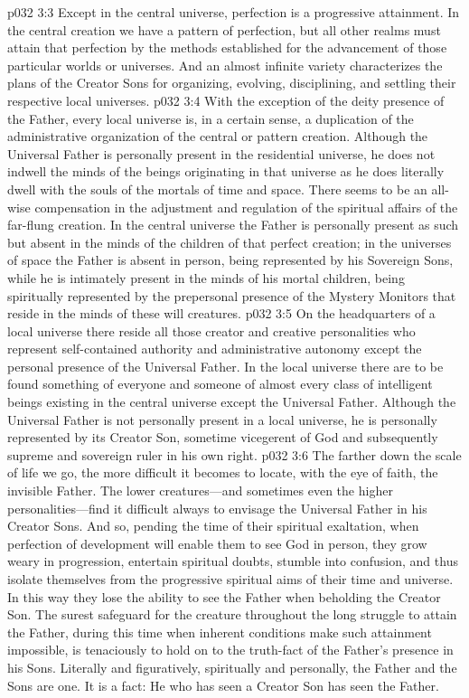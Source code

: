 \vs p032 3:3 Except in the central universe, perfection is a progressive attainment. In the central creation we have a pattern of perfection, but all other realms must attain that perfection by the methods established for the advancement of those particular worlds or universes. And an almost infinite variety characterizes the plans of the Creator Sons for organizing, evolving, disciplining, and settling their respective local universes.
\pc \vs p032 3:4 With the exception of the deity presence of the Father, every local universe is, in a certain sense, a duplication of the administrative organization of the central or pattern creation. Although the Universal Father is personally present in the residential universe, he does not indwell the minds of the beings originating in that universe as he does literally dwell with the souls of the mortals of time and space. There seems to be an all\hyp{}wise compensation in the adjustment and regulation of the spiritual affairs of the far\hyp{}flung creation. In the central universe the Father is personally present as such but absent in the minds of the children of that perfect creation; in the universes of space the Father is absent in person, being represented by his Sovereign Sons, while he is intimately present in the minds of his mortal children, being spiritually represented by the prepersonal presence of the Mystery Monitors that reside in the minds of these will creatures.
\vs p032 3:5 On the headquarters of a local universe there reside all those creator and creative personalities who represent self\hyp{}contained authority and administrative autonomy except the personal presence of the Universal Father. In the local universe there are to be found something of everyone and someone of almost every class of intelligent beings existing in the central universe except the Universal Father. Although the Universal Father is not personally present in a local universe, he is personally represented by its Creator Son, sometime vicegerent of God and subsequently supreme and sovereign ruler in his own right.
\vs p032 3:6 The farther down the scale of life we go, the more difficult it becomes to locate, with the eye of faith, the invisible Father. The lower creatures---and sometimes even the higher personalities---find it difficult always to envisage the Universal Father in his Creator Sons. And so, pending the time of their spiritual exaltation, when perfection of development will enable them to see God in person, they grow weary in progression, entertain spiritual doubts, stumble into confusion, and thus isolate themselves from the progressive spiritual aims of their time and universe. In this way they lose the ability to see the Father when beholding the Creator Son. The surest safeguard for the creature throughout the long struggle to attain the Father, during this time when inherent conditions make such attainment impossible, is tenaciously to hold on to the truth\hyp{}fact of the Father’s presence in his Sons. Literally and figuratively, spiritually and personally, the Father and the Sons are one. It is a fact: He who has seen a Creator Son has seen the Father.
